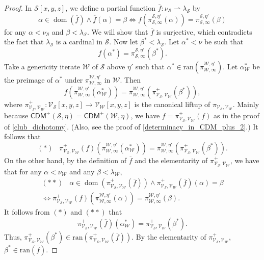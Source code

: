 \documentclass{amsart}
\DeclareMathOperator{\dom}{dom}
\begin{document}
\begin{proof}
In $\mathcal{S}[x, y, z]$, we define a partial function $\overline{f}\colon\nu_{\mathcal{S}}\rightharpoonup\lambda_{\mathcal{S}}$ by
\[
\alpha\in\dom(\overline{f})\land\overline{f}(\alpha)=\beta\iff f(\pi^{\mathcal{S}, \eta'}_{\mathcal{S}, \infty}(\alpha))=\pi^{\mathcal{S}, \eta'}_{\mathcal{S}, \infty}(\beta)
\]
for any $\alpha<\nu_{\mathcal{S}}$ and $\beta<\lambda_{\mathcal{S}}$.
We will show that $\overline{f}$ is surjective, which contradicts the fact that $\lambda_{\mathcal{S}}$ is a cardinal in $\mathcal{S}$.
Now let $\beta^*<\lambda_{\mathcal{S}}$.
Let $\alpha^*<\nu$ be such that
\[
f(\alpha^*)=\pi^{\mathcal{S}, \eta'}_{\mathcal{S}, \infty}(\beta^*).
\]
Take a genericity iterate $\mathcal{W}$ of $\mathcal{S}$ above $\eta'$ such that $\alpha^*\in\mathrm{ran}(\pi^{\mathcal{W}, \eta'}_{\mathcal{W}, \infty})$.
Let $\alpha^*_{\mathcal{W}}$ be the preimage of $\alpha^*$ under $\pi^{\mathcal{W}, \eta'}_{\mathcal{W}, \infty}$ in $\mathcal{W}$.
Then
\[
f(\pi^{\mathcal{W}, \eta'}_{\mathcal{W}, \infty}(\alpha^*_{\mathcal{W}}))=\pi^{\mathcal{W}, \eta'}_{\mathcal{W}, \infty}(\pi^+_{\mathcal{V}_{\mathcal{S}}, \mathcal{V}_{\mathcal{W}}}(\beta^*)),
\]
where $\pi^+_{\mathcal{V}_{\mathcal{S}}, \mathcal{V}_{\mathcal{W}}}\colon\mathcal{V}_{\mathcal{S}}[x, y, z]\to\mathcal{V}_{\mathcal{W}}[x, y, z]$ is the canonical liftup of $\pi_{\mathcal{V}_{\mathcal{S}}, \mathcal{V}_{\mathcal{W}}}$.
Mainly because $\mathsf{CDM}^+(\mathcal{S}, \eta)=\mathsf{CDM}^+(\mathcal{W}, \eta)$, we have $f=\pi^+_{\mathcal{V}_{\mathcal{S}}, \mathcal{V}_{\mathcal{W}}}(f)$ as in the proof of \cref{club_dichotomy}. (Also, see the proof of \cref{determinacy_in_CDM_plus_2}.)
It follows that
\[
(*)\;\;\; \pi^+_{\mathcal{V}_{\mathcal{S}}, \mathcal{V}_{\mathcal{W}}}(f)(\pi^{\mathcal{W}, \eta'}_{\mathcal{W}, \infty}(\alpha^*_{\mathcal{W}}))=\pi^{\mathcal{W}, \eta'}_{\mathcal{W}, \infty}(\pi^+_{\mathcal{V}_{\mathcal{S}}, \mathcal{V}_{\mathcal{W}}}(\beta^*)).
\]
On the other hand, by the definition of $\overline{f}$ and the elementarity of $\pi^+_{\mathcal{V}_{\mathcal{S}}, \mathcal{V}_{\mathcal{W}}}$, we have that for any $\alpha<\nu_{\mathcal{W}}$ and any $\beta<\lambda_{\mathcal{W}}$,
\begin{multline*}
(**)\;\;\; \alpha\in\dom(\pi^+_{\mathcal{V}_{\mathcal{S}}, \mathcal{V}_{\mathcal{W}}}(\overline{f}))\land\pi^+_{\mathcal{V}_{\mathcal{S}}, \mathcal{V}_{\mathcal{W}}}(\overline{f})(\alpha)=\beta\\
\iff \pi^+_{\mathcal{V}_{\mathcal{S}}, \mathcal{V}_{\mathcal{W}}}(f)(\pi^{\mathcal{W}, \eta'}_{\mathcal{W}, \infty}(\alpha))=\pi^{\mathcal{W}, \eta'}_{\mathcal{W}, \infty}(\beta).
\end{multline*}
It follows from $(*)$ and $(**)$ that
\[
\pi^{+}_{\mathcal{V}_{\mathcal{S}}, \mathcal{V}_{\mathcal{W}}}(\overline{f})(\alpha^*_{\mathcal{W}})=\pi^+_{\mathcal{V}_{\mathcal{S}}, \mathcal{V}_{\mathcal{W}}}(\beta^*).
\]
Thus, $\pi^+_{\mathcal{V}_{\mathcal{S}}, \mathcal{V}_{\mathcal{W}}}(\beta^*)\in\mathrm{ran}(\pi^{+}_{\mathcal{V}_{\mathcal{S}}, \mathcal{V}_{\mathcal{W}}}(\overline{f}))$.
By the elementarity of $\pi^{+}_{\mathcal{V}_{\mathcal{S}}, \mathcal{V}_{\mathcal{W}}}$, $\beta^*\in\mathrm{ran}(\overline{f})$.
\end{proof}
\end{document}
